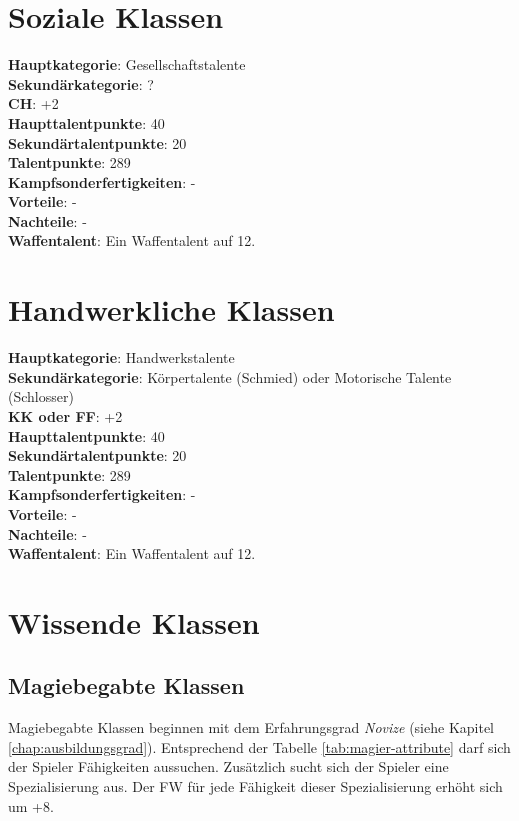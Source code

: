 \section{Soziale Klassen}
\textbf{Hauptkategorie}: Gesellschaftstalente \\
\textbf{Sekundärkategorie}: ? \\
\textbf{CH}: +2 \\
\textbf{Haupttalentpunkte}: 40 \\
\textbf{Sekundärtalentpunkte}: 20 \\
\textbf{Talentpunkte}: 289 \\
\textbf{Kampfsonderfertigkeiten}: - \\
\textbf{Vorteile}: - \\
\textbf{Nachteile}: - \\
\textbf{Waffentalent}: Ein Waffentalent auf 12.

\section{Handwerkliche Klassen}
\textbf{Hauptkategorie}: Handwerkstalente \\
\textbf{Sekundärkategorie}: Körpertalente (Schmied) oder Motorische Talente (Schlosser) \\
\textbf{KK oder FF}: +2 \\
\textbf{Haupttalentpunkte}: 40 \\
\textbf{Sekundärtalentpunkte}: 20 \\
\textbf{Talentpunkte}: 289 \\
\textbf{Kampfsonderfertigkeiten}: - \\
\textbf{Vorteile}: - \\
\textbf{Nachteile}: - \\
\textbf{Waffentalent}: Ein Waffentalent auf 12.

\section{Wissende Klassen}
\subsection{Magiebegabte Klassen}
Magiebegabte Klassen beginnen mit dem Erfahrungsgrad \textit{Novize} (siehe Kapitel \ref{chap:ausbildungsgrad}). Entsprechend der Tabelle \ref{tab:magier-attribute} darf sich der Spieler Fähigkeiten aussuchen. Zusätzlich sucht sich der Spieler eine Spezialisierung aus. Der FW für jede Fähigkeit dieser Spezialisierung erhöht sich um +8.

